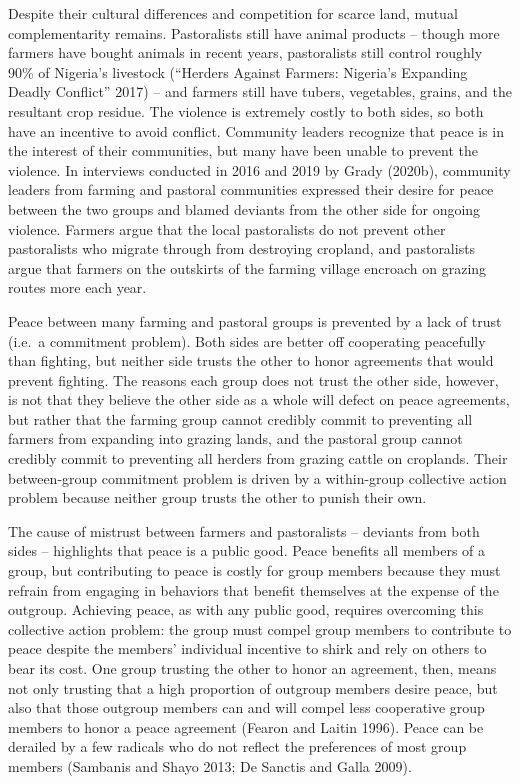 \documentclass[11pt]{article}
\begin{document}
Despite their cultural differences and competition for scarce land,
mutual complementarity remains. Pastoralists still have animal products
-- though more farmers have bought animals in recent years, pastoralists
still control roughly 90\% of Nigeria's livestock (``Herders Against
Farmers: Nigeria's Expanding Deadly Conflict'' 2017) -- and farmers
still have tubers, vegetables, grains, and the resultant crop residue.
The violence is extremely costly to both sides, so both have an
incentive to avoid conflict. Community leaders recognize that peace is
in the interest of their communities, but many have been unable to
prevent the violence. In interviews conducted in 2016 and 2019 by Grady
(2020b), community leaders from farming and pastoral communities
expressed their desire for peace between the two groups and blamed
deviants from the other side for ongoing violence. Farmers argue that
the local pastoralists do not prevent other pastoralists who migrate
through from destroying cropland, and pastoralists argue that farmers on
the outskirts of the farming village encroach on grazing routes more
each year.

Peace between many farming and pastoral groups is prevented by a lack of
trust (i.e.~a commitment problem). Both sides are better off cooperating
peacefully than fighting, but neither side trusts the other to honor
agreements that would prevent fighting. The reasons each group does not
trust the other side, however, is not that they believe the other side
as a whole will defect on peace agreements, but rather that the farming
group cannot credibly commit to preventing all farmers from expanding
into grazing lands, and the pastoral group cannot credibly commit to
preventing all herders from grazing cattle on croplands. Their
between-group commitment problem is driven by a within-group collective
action problem because neither group trusts the other to punish their
own.

The cause of mistrust between farmers and pastoralists -- deviants from
both sides -- highlights that peace is a public good. Peace benefits all
members of a group, but contributing to peace is costly for group
members because they must refrain from engaging in behaviors that
benefit themselves at the expense of the outgroup. Achieving peace, as
with any public good, requires overcoming this collective action
problem: the group must compel group members to contribute to peace
despite the members' individual incentive to shirk and rely on others to
bear its cost. One group trusting the other to honor an agreement, then,
means not only trusting that a high proportion of outgroup members
desire peace, but also that those outgroup members can and will compel
less cooperative group members to honor a peace agreement (Fearon and
Laitin 1996). Peace can be derailed by a few radicals who do not reflect
the preferences of most group members (Sambanis and Shayo 2013; De
Sanctis and Galla 2009).
\end{document}
